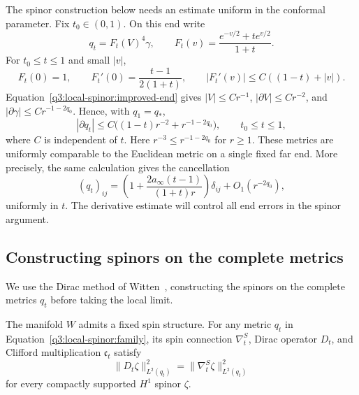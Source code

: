 The spinor construction below needs an estimate uniform in the conformal
parameter. Fix \(t_0\in(0,1)\). On this end write
\[
 q_t=F_t(V)^4\gamma,\qquad
 F_t(v)=\frac{e^{-v/2}+t e^{v/2}}{1+t}.
\]
For \(t_0\le t\le1\) and small \(|v|\),
\[
 F_t(0)=1,\qquad F_t'(0)=\frac{t-1}{2(1+t)},\qquad
 |F_t'(v)|\le C((1-t)+|v|).
\]
Equation~\eqref{q3:local-spinor:improved-end} gives
\(|V|\le Cr^{-1}\), \(|\partial V|\le Cr^{-2}\), and
\(|\partial\gamma|\le Cr^{-1-2q_0}\). Hence, with \(q_1=q_*\),
\begin{equation}\label{q3:local-spinor:uniform-derivative}
 |\partial q_t|\le C\bigl((1-t)r^{-2}+r^{-1-2q_0}\bigr),
 \qquad t_0\le t\le1,
\end{equation}
where \(C\) is independent of \(t\). Here \(r^{-3}\le
r^{-1-2q_0}\) for \(r\ge1\). These metrics are uniformly
comparable to the Euclidean metric on a single fixed far end. More
precisely, the same calculation gives the cancellation
\begin{equation}\label{q3:local-spinor:leading-cancellation}
 (q_t)_{ij}=
 \left(1+\frac{2a_\infty(t-1)}{(1+t)r}\right)\delta_{ij}
       +O_1(r^{-2q_0}),
\end{equation}
uniformly in \(t\). The derivative estimate will control all end
errors in the spinor argument.

\subsection{Constructing spinors on the complete metrics}

We use the Dirac method of Witten~\cite{Witten1981}, constructing the
spinors on the complete metrics $q_t$ before taking the local limit.

\begin{lemma}
\label{q3:local-spinor:structure}
The manifold $W$ admits a fixed spin structure.  For any metric
$q_t$ in Equation~\eqref{q3:local-spinor:family}, its spin connection
$\nabla^S_t$, Dirac operator $D_t$, and Clifford multiplication
$\mathfrak c_t$ satisfy
\begin{equation}\label{q3:local-spinor:lichnerowicz}
 \|D_t\zeta\|_{L^2(q_t)}^2
       =\|\nabla^S_t\zeta\|_{L^2(q_t)}^2
\end{equation}
for every compactly supported $H^1$ spinor $\zeta$.
\end{lemma}

